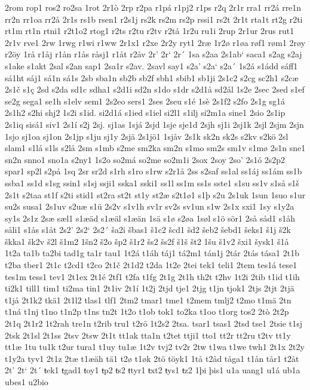 2rom
rop1
ros2
ro2sa
1rot
2r1ò
2rp
r2pa
r1pá
r1pj2
r1ps
r2q
2r1r
rra1
rr2á
rre1n
rr2n
rr1oa
rr2å
2r1s
rs1b
rsen1
r2s1j
rs2k
rs2m
rs2p
rssi1
rs2t
2r1t
rta1t
rt2g
r2ti
rt1m
rt1n
rtni1
r2t1o2
rtog1
r2ts
r2tu
r2tv
r2tå
1r2u
ru1i
2rup
2r1ur
2rus
rut1
2r1v
rve1
2rw
1rwg
r1wi
r1ww
2r1x1
r2xe
2r2y
ryt1
2ræ
1r2ø
r1øa
røf1
røm1
2røy
r2öy
1rå
r1åj
r1ån
r1ås
råsj1
r1åt
r2åv
2r'
2r`
2r´
1sa
s2aa
2s1ab`
saca1
s2ag
s2aj
s1ake
s1akt
2sal
s2an
sap1
2sa1r
s2av.
2savl
say1
s2a'
s2a`
s2a´
1s2á
s1ádd
sáff1
sá1ht
sáj1
sá1n
sá1s
2sb
sba1n
sb2b
sb2f
sbh1
sbib1
sb1ji
2s1c2
s2cg
sc2h1
s2cæ
2s1č
s1ç
2sd
s2da
sd1c
sdha1
s2d1i
sd2n
s1do
s1dr
s2d1å
sd2ål
1s2e
2sec
2sed
s1ef
se2g
sega1
se1h
s1elv
sem1
2s2eo
sers1
2ses
2seu
s1é
1sè
2s1f2
s2fo
2s1g
sg1á
2s1h2
s2hi
shj2
1s2i
s1id.
si2d1á
s1ied
s1iel
si2l1
s1ilj
si2m1a
sine1
2sio
2s1ip
2s1iq
sisá1
siv1
2s1í
s2j
2sj.
sj1as
1sjá
2sjd
1sje
sje1d
2sjh
sj1i
2sj1k
2sjl
2sjm
2sjn
1sjo
sj1oa
sj1on
2s1jp
s1ju
sj1y
2sjä
2s1jö1
1sjåv
2s1k
sk2n
sk2s
s2kv
s2kö
2sl
slam1
s1lá
s1ls
s2lå
2sm
s1mb
s2me
sm2ka
sm2n
s1mo
sm2s
sm1v
s1mø
2s1n
sne1
sn2n
snno1
sno1a
s2ny1
1s2o
so2má
so2me
so2m1i
2sox
2soy
2so'
2s1ó
2s2p2
spar1
sp2l
s2på
1sq
2sr
sr2d
s1rh
s1ro
s1rw
s2r1å
2ss
s2saf
ss1al
ss1áj
ss1ám
ss1b
ssba1
ss1d
s1sg
ssin1
s1sj
ssji1
sska1
sski1
ss1l
ss1m
ss1s
sste1
s1su
ss1v
s1så
s1š
2s1t
s2taa
st1f
s2ti
stid1
st2ra
st2t
st1y
st2æ
s2t1ø1
s1þ
s2u
2s1uk
1sun
1suo
s1ur
su2s
susa1
2s1uv
s2uæ
s1ü
2s2v
s1v1h
sv1r
sv2s
sv1un
s1w
2s1x
sxi1
1sy
s1y2a
sy1s
2s1z
2sæ
sæl1
s1æäd
s1æäl
s1æän
1sä
s1ø
s2øa
1søl
s1ö
sör1
2så
såd1
s1åh
såli1
s1ås
s1åt
2s2'
2s2`
2s2´
ša2i
šbas1
š1c2
šcd1
šd2
šeb2
šebd1
šeks1
š1j
š2k
škka1
šk2v
š2l
š1m2
1šn2
š2o
šp2
š1r2
šs2
šs2f
š1š
št2
1šu
š1v2
šxi1
šysk1
š1å
1t2a
ta1b
ta2bi
tad1g
ta1r
tau1
1t2á
t1áh
táj1
tá2m1
tán1j
2tár
2tás
tása1
2t1b
t2ba
tber1
2t1c
t2cd1
t2co
2t1č
2t1d2
t2da
1t2e
2tei
tek1
teli1
2tem
tes1á
tese1
tes1m
tess1
tev1
2t1ex
2t1é
2tf1
t2fa
t1fg
2t1g
2t1h
th2t
t2hv
1t2i
2tib
t1id
t1ih
ti2k1
till1
tim1
ti2ma
tin1
2t1iv
2t1í
1t2j
2tjd
tje1
2tjg
t1jn
tjok1
2tjs
2tjt
2tjä
t1jå
2t1k2
tkä1
2t1l2
tlas1
tlf1
2tm2
tmar1
tme1
t2mem
tmlj2
t2mo
t1mä
2tn
t1ná
t1nj
t1no
t1n2p
t1ns
tn2t
1t2o
t1ob
tok1
to2ka
t1oo
t1org
tos2
2tò
2t2p
2t1q
2t1r2
1t2rah
tre1n
t2rib
tru1
t2rö
1t2s2
2tsa.
tsar1
tsas1
2tsd
tse1
2tsie
t1sj
2tsk
2t1sl
2t1ss
2tsv
2tsw
2t1t
tt1ak
tta1n
t2tet
ttji1
tto1
tt2r
tt2ru
t2tv
tt1y
tt1æ
1tu
tu1k
t2ur
tura1
t1uy
tu1æ
1t2v
tvj2
tv2r
2tw
t1wa
t1we
twh1
2t1x
2t2y
t1y2a
tyv1
2t1z
2tæ
t1æäh
tä1
t2ø
t1øk
2tö
töyk1
1tå
t2åd
tåga1
t1ån
tår1
t2åt
2t'
2t`
2t´
ŧek1
ŧgad1
ŧoy1
ŧp2
ŧs2
ŧtyr1
ŧxt2
ŧys1
ŧz2
1þi
þis1
u1a
uang1
u1á
ub1a
ubes1
u2bio
